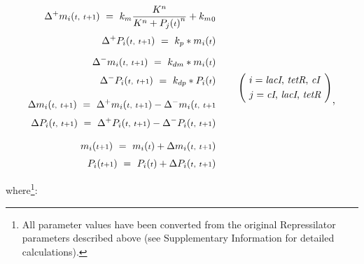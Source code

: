 \documentclass[runningheads,a4paper]{llncs}
\begin{document}
\begin{equation*}
    \begin{aligned}
        \Delta^{+}m_{i}({\scriptstyle t,\ t+1})\ =\ k_{m}\frac{K^{n}}{K^{n}+{P_{j}({\scriptstyle t})}^{n}}+{k_{m}}_{0} \\[0.1cm]
        \Delta^{+}P_{i}({\scriptstyle t,\ t+1})\ =\ k_{p}*{m_{i}({\scriptstyle t})} \\[0.2cm]
        \Delta^{-}m_{i}({\scriptstyle t,\ t+1})\ =\ k_{dm}*{m_{i}({\scriptstyle t})} \\[0.1cm]
        \Delta^{-}P_{i}({\scriptstyle t,\ t+1})\ =\ k_{dp}*{P_{i}({\scriptstyle t})} \\[0.3cm]
        \Delta m_{i}({\scriptstyle t,\ t+1})\ =\ \Delta^{+}m_{i}({\scriptstyle t,\ t+1}) - \Delta^{-}m_{i}({\scriptstyle t,\ t+1} \\[0.1cm]
        \Delta P_{i}({\scriptstyle t,\ t+1})\ =\ \Delta^{+}P_{i}({\scriptstyle t,\ t+1}) - \Delta^{-}P_{i}({\scriptstyle t,\ t+1}) \\[0.3cm]
        m_{i}({\scriptstyle t+1})\ =\ m_{i}({\scriptstyle t}) + \Delta m_{i}({\scriptstyle t,\ t+1}) \\[0.1cm]
        P_{i}({\scriptstyle t+1})\ =\ P_{i}({\scriptstyle t}) + \Delta P_{i}({\scriptstyle t,\ t+1})
    \end{aligned}
    \hspace{0.8cm}
    \Bigg(\ 
        \begin{aligned}
            i = \textrm{\textit{lacI}, \textit{tetR}, \textit{cI}}    \\
            j = \textrm{\textit{cI}, \textit{lacI}, \textit{tetR}}
        \end{aligned}\ 
    \Bigg)_\textrm{\large{,}}
\end{equation*}
    
\noindent where\footnote{All parameter values have been converted from the original Repressilator parameters described above (see Supplementary Information for detailed calculations).}:
\end{document}

